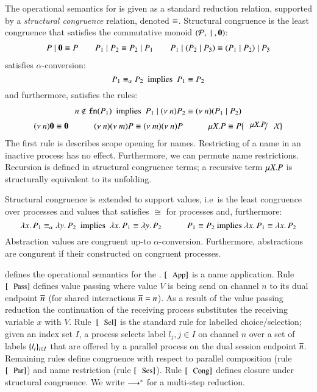 The operational semantics for \HOp is given as a standard reduction relation,
supported by a \emph{structural congruence} relation, denoted $\equiv$. 
Structural congruence is 
the least congruence that satisfies the commutative monoid $(\mathcal{P}, \;|\;, \mathbf{0})$:
%
\[
\begin{array}{c}
	P \;|\; \mathbf{0} \equiv P
	\qquad
	P_1 \;|\; P_2 \equiv P_2 \;|\; P_1
	\qquad
	P_1 \;|\; (P_2 \;|\; P_3) \equiv (P_1 \;|\; P_2) \;|\; P_3
\end{array}
\]
%
\noi satisfies $\alpha$-conversion:
\[
	P_1 \equiv_\alpha P_2\ \textrm{  implies  }\ P_1 \equiv P_2
\]
\noi and furthermore, satisfies the rules:
%
\[
\begin{array}{c}
	n \notin \fn{P_1}\ \textrm{  implies  }\ P_1 \Par \news{n} P_2 \scong \news{n}(P_1 \Par P_2)
	\\[2mm]
	\news{n} \inact \scong \inact
	\qquad \quad
	\news{n} \news{m} P \scong \news{m} \news{n} P
	\qquad \quad
	\recp{X}{P} \scong P\subst{\recp{X}{P}}{\rvar{X}}
\end{array}
\]
\noi The first rule is describes scope opening for names.
Restricting of a name in an inactive process has no effect.
Furthermore, we can permute name restrictions.
Recursion is defined in structural congruence terms;
a recursive term $\mu X. P$ is structurally
equivalent to its unfolding.

Structural congruence is extended to support values,
i.e~is the least congruence over processes and values
that satisfies $\cong$ for processes and, furthermore:
%
\[
	\lambda x.\,P_1 \equiv_\alpha \lambda y.\,P_2\ \textrm{ implies }\ \lambda x.\,P_1 \equiv \lambda y.\,P_2
	\qquad \quad
	P_1 \equiv P_2 \textrm{ implies } \lambda x.\,P_1 \equiv \lambda x.\,P_2
\]
%
\noi Abstraction values are congruent up-to $\alpha$-conversion.
Furthermore, abstractions are congurent if their constructed on
congruent processes.





 defines
the operational semantics for the \HOp.
$\orule{App}$ is a name application.
Rule~$\orule{Pass}$ defines value passing where
value $V$ is being send on channel $n$ to its dual endpoint $\overline{n}$
(for shared interactions $\overline{n} = n$).
As a result of the value passing reduction the continuation of the 
receiving process substitutes the receiving variable $x$ with $V$.
Rule~$\orule{Sel}$ is the standard rule for labelled choice/selection;
given an index set $I$,
a process selects label $l_j, j \in I$ on channel $n$ over a set of
labels $\{l_i\}_{i \in I}$ that are offered by a parallel process
on the dual session endpoint $\overline{n}$.
Remaining rules define congruence 
with respect to parallel composition (rule $\orule{Par}$)
and name restriction (rule $\orule{Ses}$).
Rule $\orule{Cong}$ defines closure under structural congruence.
We write $\longrightarrow^\ast$ for a multi-step reduction. 

